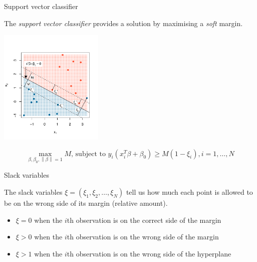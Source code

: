 \documentclass[notes]{beamer}          %
\newcommand{\norm}[1]{\left\lVert#1\right\rVert}
\providecommand{\norm}[1]{\lVert#1\rVert}
\begin{document}
\begin{frame}{Support vector classifier}

The \textit{support vector classifier} provides a solution by maximising a \textit{soft} margin.
\begin{center}
\includegraphics[height=5.5cm]{../figures/week_2_classification/svm_support_vector_classifier.pdf}  
\end{center}

\vspace{-7mm} 

\begin{equation*}
\max_{\beta, \beta_0, \norm{\beta} = 1} M \text{, subject to } y_i(x^T_i \beta + \beta_0) \geq M (1-\xi_i), i=1, \dots, N
\end{equation*}

\end{frame}

\begin{frame}{Slack variables}

The slack variables $\xi = (\xi_1, \xi_2, \dots, \xi_N)$ tell us how much each point is allowed to be on the wrong side of its margin (relative amount).

\begin{itemize}
    \item $\xi = 0$ when the $i$th observation is on the correct side of the margin
    \item $\xi > 0$ when the $i$th observation is on the wrong side of the margin
    \item $\xi > 1$ when the $i$th observation is on the wrong side of the hyperplane
\end{itemize}


\end{frame}
\end{document}
